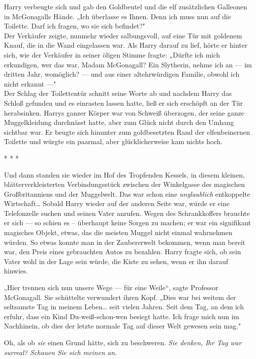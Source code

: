 {Harry verbeugte sich und gab den Goldbeutel und die elf zusätzlichen Galleonen in McGonagalls Hände. „Ich überlasse es Ihnen. Denn ich muss nun auf die Toilette. Darf ich fragen, wo sie sich befindet?"\\ Der Verkäufer zeigte, nunmehr wieder salbungsvoll, auf eine Tür mit goldenem Knauf, die in die Wand eingelassen war. Als Harry darauf zu lief, hörte er hinter sich, wie der Verkäufer in seiner öligen Stimme fragte: „Dürfte ich mich erkundigen, wer das war, Madam McGonagall? Ein Slytherin, nehme ich an --- im dritten Jahr, womöglich? --- und aus einer altehrwürdigen Familie, obwohl ich nicht erkannt ---"\\ Der Schlag der Toilettentür schnitt seine Worte ab und nachdem Harry das Schloß gefunden und es einrasten lassen hatte, ließ er sich erschöpft an der Tür herabsinken. Harrys ganzer Körper war von Schweiß überzogen, der seine ganze Muggelkleidung durchnässt hatte, aber zum Glück nicht durch den Umhang sichtbar war. Er beugte sich hinunter zum goldbesetzten Rand der elfenbeinernen Toilette und würgte ein paarmal, aber glücklicherweise kam nichts hoch.

* * *

Und dann standen sie wieder im Hof des Tropfenden Kessels, in diesem kleinen, blätterverkleisterten Verbindungsstück zwischen der Winkelgasse des magischen Großbritanniens und der Muggelwelt. Das war schon eine \emph{unglaublich} entkoppelte Wirtschaft… Sobald Harry wieder auf der anderen Seite war, würde er eine Telefonzelle suchen und seinen Vater anrufen. Wegen des Schrankkoffers brauchte er sich --- so schien es -- überhaupt keine Sorgen zu machen; er war ein signifikant magisches Objekt, etwas, das die meisten Muggel nicht einmal wahrnehmen würden. So etwas konnte man in der Zaubererwelt bekommen, wenn man bereit war, den Preis eines gebrauchten Autos zu bezahlen. Harry fragte sich, ob sein Vater wohl in der Lage sein würde, die Kiste zu sehen, wenn er ihn darauf hinwies.

„Hier trennen sich nun unsere Wege --- für eine Weile“, sagte Professor McGonagall. Sie schüttelte verwundert ihren Kopf. „Dies war bei weitem der seltsamste Tag in meinem Leben… seit vielen Jahren. Seit dem Tag, an dem ich erfuhr, dass ein Kind Du-weiß-schon-wen besiegt hatte. Ich frage mich nun im Nachhinein, ob dies der letzte normale Tag auf dieser Welt gewesen sein mag."

Oh, als ob \emph{sie} einen Grund hätte, sich zu beschweren. \emph{Sie denken, Ihr Tag war surreal? Schauen Sie sich meinen an.}

}
